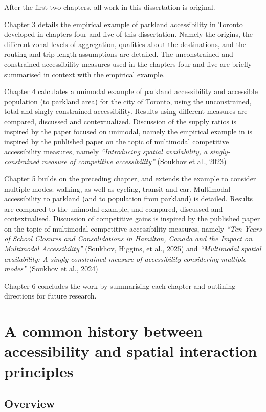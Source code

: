 \documentclass[
11pt, %
oneside, %
english, %
singlespacing, %
]{macthesis} %
\begin{document}
After the first two chapters, all work in this dissertation is original.

Chapter 3 details the empirical example of parkland accessibility in Toronto developed in chapters four and five of this dissertation. Namely the origins, the different zonal levels of aggregation, qualities about the destinations, and the routing and trip length assumptions are detailed. The unconstrained and constrained accessibility measures used in the chapters four and five are briefly summarised in context with the empirical example.

Chapter 4 calculates a unimodal example of parkland accessibility and accessible population (to parkland area) for the city of Toronto, using the unconstrained, total and singly constrained accessibility. Results using different measures are compared, discussed and contextualized. Discussion of the supply ratios is inspired by the paper focused on unimodal, namely the empirical example in is inspired by the published paper on the topic of multimodal competitive accessibility measures, namely \emph{``Introducing spatial availability, a singly-constrained measure of competitive accessibility''} (Soukhov et al., 2023)

Chapter 5 builds on the preceding chapter, and extends the example to consider multiple modes: walking, as well as cycling, transit and car. Multimodal accessibility to parkland (and to population from parkland) is detailed. Results are compared to the unimodal example, and compared, discussed and contextualised. Discussion of competitive gains is inspired by the published paper on the topic of multimodal competitive accessibility measures, namely \emph{``Ten Years of School Closures and Consolidations in Hamilton, Canada and the Impact on Multimodal Accessibility''} (Soukhov, Higgins, et al., 2025) and \emph{``Multimodal spatial availability: A singly-constrained measure of accessibility considering multiple modes''} (Soukhov et al., 2024)

Chapter 6 concludes the work by summarising each chapter and outlining directions for future research.

\chapter{A common history between accessibility and spatial interaction principles}\label{a-common-history-between-accessibility-and-spatial-interaction-principles}

\section{Overview}\label{overview}
\end{document}
